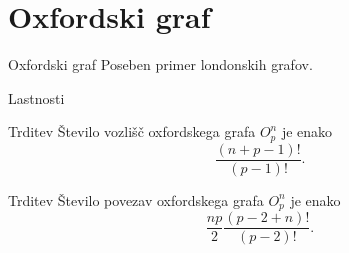 \documentclass{beamer}
\begin{document}
\section{Oxfordski graf}
\begin{frame}{Oxfordski graf}
	Poseben primer londonskih grafov.
\end{frame}
\begin{frame}{Lastnosti}
	\begin{block}{Trditev}
		Število vozlišč oxfordskega grafa $O^n_p$ je enako \[\frac{(n+p-1)!}{(p-1)!}.\]
	\end{block}
	
	\begin{block}{Trditev}
		Število povezav oxfordskega grafa $O^n_p$ je enako
		\[ \frac{np}{2} \frac{(p-2+n)!}{(p-2)!} .\]
	\end{block}
\end{frame}

\end{document}
